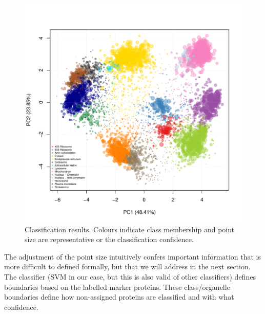 \begin{figure}[!ht]
  \centering
\begin{knitrout}
\color{fgcolor}\begin{kframe}
\begin{alltt}
 \hlkwb{<-} \hlstd{(}\hlopt{$} \hlopt{-} 
  \hlstd{=} \hlstd{,}  
  \hlstd{=} \hlstd{,}  \hlstd{=} \hlstd{,}  \hlstd{=} \hlstd{,}  \hlstd{=} \hlstd{)}
\end{alltt}
\end{kframe}
\includegraphics[width=.8\textwidth]{figure/plotSVM-1} 

\end{knitrout}
\caption{Classification results. Colours indicate class membership and
  point size are representative or the classification confidence.}
  \label{fig:plotSVM}
\end{figure}


The adjustment of the point size intuitively confers important
information that is more difficult to defined formally, but that we
will address in the next section. The classifier (SVM in our case, but
this is also valid of other classifiers) defines boundaries based on
the labelled marker proteins. These class/organelle boundaries define
how non-assigned proteins are classified and with what confidence.

